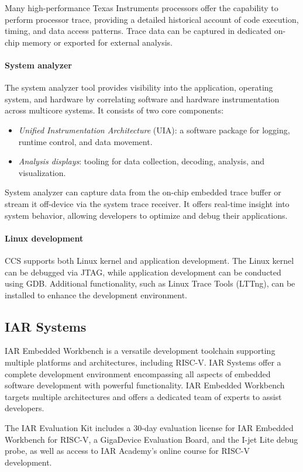 Many high-performance Texas Instruments processors offer the capability to perform processor trace, providing a detailed historical account of code execution, timing, and data access patterns. 
Trace data can be captured in dedicated on-chip memory or exported for external analysis.

\paragraph*{System analyzer}
The system analyzer tool provides visibility into the application, operating system, and hardware by correlating software and hardware instrumentation across multicore systems.
It consists of two core components:
\begin{itemize}
    \item \textit{Unified Instrumentation Architecture} (UIA): a software package for logging, runtime control, and data movement.
    \item \textit{Analysis displays}: tooling for data collection, decoding, analysis, and visualization.
\end{itemize}
System analyzer can capture data from the on-chip embedded trace buffer or stream it off-device via the system trace receiver. 
It offers real-time insight into system behavior, allowing developers to optimize and debug their applications.

\paragraph*{Linux development}
CCS supports both Linux kernel and application development.
The Linux kernel can be debugged via JTAG, while application development can be conducted using GDB. 
Additional functionality, such as Linux Trace Tools (LTTng), can be installed to enhance the development environment.

\subsection{IAR Systems}
IAR Embedded Workbench is a versatile development toolchain supporting multiple platforms and architectures, including RISC-V. 
IAR Systems offer a complete development environment encompassing all aspects of embedded software development with powerful functionality. 
IAR Embedded Workbench targets multiple architectures and offers a dedicated team of experts to assist developers.

The IAR Evaluation Kit includes a 30-day evaluation license for IAR Embedded Workbench for RISC-V, a GigaDevice Evaluation Board, and the I-jet Lite debug probe, as well as access to IAR Academy's online course for RISC-V development.